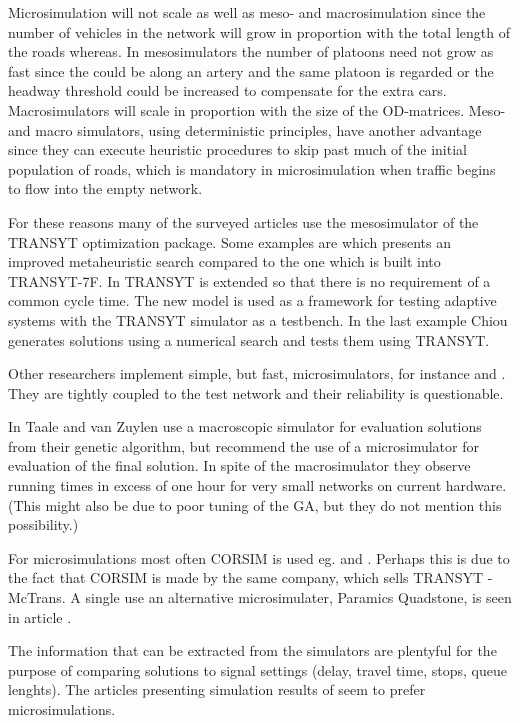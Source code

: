 Microsimulation will not scale as well as meso- and macrosimulation since the number of vehicles in the network will grow in proportion with the total length of the roads whereas. In mesosimulators the number of platoons need not grow as fast since the could be along an artery and the same platoon is regarded or the headway threshold could be increased to compensate for the extra cars. Macrosimulators will scale in proportion with the size of the OD-matrices. 
Meso- and macro simulators, using deterministic principles, have another advantage since they can execute heuristic procedures to skip past much of the initial population of roads, which is mandatory in microsimulation when traffic begins to flow into the empty network.

For these reasons many of the surveyed articles use the mesosimulator of the TRANSYT optimization package. Some examples are \cite{26} which presents an improved metaheuristic search compared to the one which is built into TRANSYT-7F. In \cite{43} TRANSYT is extended so that there is no requirement of a common cycle time. The new model is used as a framework for testing adaptive systems with the TRANSYT simulator as a testbench.
In the last example Chiou \cite{34} generates solutions using a numerical search and tests them using TRANSYT.

Other researchers implement simple, but fast, microsimulators, for instance \cite{12} and \cite{42}. They are tightly coupled to the test network and their reliability is questionable.

In \cite{31} Taale and van Zuylen use a macroscopic simulator for evaluation solutions from their genetic algorithm, but recommend the use of a microsimulator for evaluation of the final solution. In spite of the macrosimulator they observe running times in excess of one hour for very small networks on current hardware. (This might also be due to poor tuning of the GA, but they do not mention this possibility.)

For microsimulations most often CORSIM is used eg.  \cite{1} and \cite{35}. Perhaps this is due to the fact that CORSIM is made by the same company, which sells TRANSYT - McTrans. A single use an alternative microsimulater, Paramics Quadstone, is seen in article \cite{21}.

The information that can be extracted from the simulators are plentyful for the purpose of comparing solutions to signal settings (delay, travel time, stops, queue lenghts). The articles presenting simulation results of seem to prefer microsimulations.